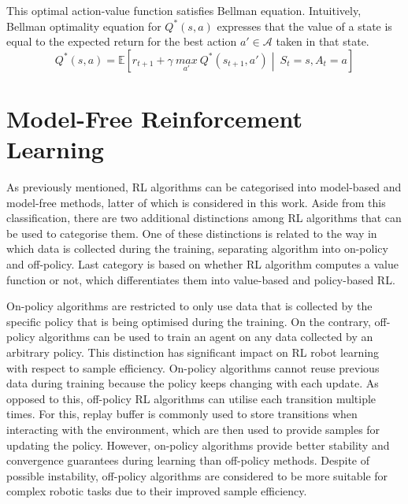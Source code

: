 This optimal action-value function satisfies Bellman equation. Intuitively, Bellman optimality equation for \(Q^{*}(s, a)\) expresses that the value of a state is equal to the expected return for the best action \(a' \in \mathcal{A}\) taken in that state.
\begin{equation}
    Q^{*}(s, a) = \mathbb{E} \left[ r_{t+1} + \gamma\ \underset{a'}{max}\ Q^{*}(s_{t+1}, a') \middle\vert\ S_{t}{=}s, A_{t}{=}a \right]
\end{equation}


\section{Model-Free Reinforcement Learning}

As previously mentioned, RL algorithms can be categorised into model-based and model-free methods, latter of which is considered in this work. Aside from this classification, there are two additional distinctions among RL algorithms that can be used to categorise them. One of these distinctions is related to the way in which data is collected during the training, separating algorithm into on-policy and off-policy. Last category is based on whether RL algorithm computes a value function or not, which differentiates them into value-based and policy-based RL.

On-policy algorithms are restricted to only use data that is collected by the specific policy that is being optimised during the training. On the contrary, off-policy algorithms can be used to train an agent on any data collected by an arbitrary policy. This distinction has significant impact on RL robot learning with respect to sample efficiency. On-policy algorithms cannot reuse previous data during training because the policy keeps changing with each update. As opposed to this, off-policy RL algorithms can utilise each transition multiple times. For this, replay buffer \cite{mnih_human-level_2015} is commonly used to store transitions when interacting with the environment, which are then used to provide samples for updating the policy. However, on-policy algorithms provide better stability and convergence guarantees during learning than off-policy methods. Despite of possible instability, off-policy algorithms are considered to be more suitable for complex robotic tasks due to their improved sample efficiency.


